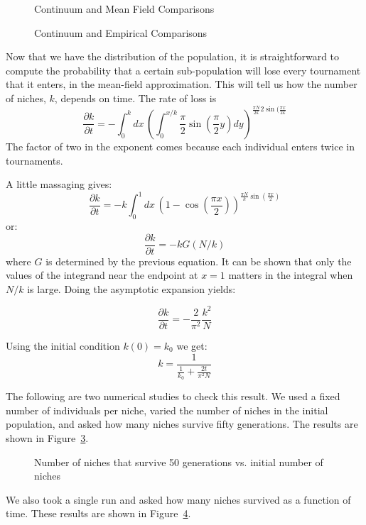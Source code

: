 \begin{figure}
\caption{Continuum and Mean Field Comparisons}
\label{predpop}
\end{figure}

\begin{figure}
\caption{Continuum and Empirical Comparisons}
\label{empvscon}
\end{figure}

Now that we have the distribution of the population, it is straightforward
to compute the probability that a certain sub-population will lose every
tournament that it enters, in the mean-field approximation.  This will
tell us how the number of niches, $k$, depends on time.
The rate of loss is
\begin{equation}
\frac{\partial k}{\partial t}= -
\int_0^k{dx\,(\int_0^{x/k}\frac{\pi}{2}\sin(\frac{\pi}{2}y)dy)^{
	\frac{\pi N}{2 k} 2 \sin(\frac{\pi x}{2 k}}}
\end{equation}
The factor of two in the exponent comes because each individual enters
twice in tournaments.

A little massaging gives:
\begin{equation}
\frac{\partial k}{\partial t}= -
k \int_0^1{dx\,(1-\cos(\frac{\pi x}{2}))^{\frac{\pi N}{k} \sin(\frac{\pi x}{2})}}
\end{equation}
or:
\begin{equation}
\frac{\partial k}{\partial t}=-k G(N/k)
\end{equation}
where $G$ is determined by the previous equation.
It can be shown that only the values of the integrand near the endpoint at $x=1$
matters in the integral when $N/k$ is large.  Doing the asymptotic
expansion yields:

\begin{equation}
\frac{\partial k}{\partial t}=-\frac{2}{\pi^2}\frac{k^2}{N}
\end{equation}

Using the initial condition $k(0)=k_0$ we get:
\begin{equation}
k=\frac{1}{\frac{1}{k_0}+\frac{2t}{\pi^2 N}}
\end{equation}

The following are two numerical studies to check this result.  We used
a fixed number of individuals per niche, varied the number of niches in
the initial population, and asked how many niches survive fifty generations.
The results are shown in Figure~\ref{survniche}.
\begin{figure}
\label{survniche}
\caption{Number of niches that survive 50 generations vs. initial number of niches}
\end{figure}
We also took a single run and asked how many niches survived as a function
of time.  These results are shown in Figure~\ref{survnic2}.
\begin{figure}
\label{survnic2}
\end{figure}

